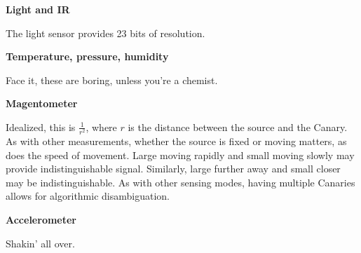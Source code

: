 \documentclass[11pt]{letter} %
\begin{document}
\vspace{30 pt}

\textbf{Light and IR}

The light sensor provides 23 bits of resolution. 

\vspace{30 pt}

\textbf{Temperature, pressure, humidity}

Face it, these are boring, unless you're a chemist.

\vspace{30 pt}

\textbf{Magentometer}

Idealized, this is \(\frac{1}{r^2}\), where \(r\) is the distance between the source and the Canary. As with other measurements, whether the source is fixed or moving matters, as does the speed of movement. Large moving rapidly and small moving slowly may provide indistinguishable signal. Similarly, large further away and small closer may be indistinguishable. As with other sensing modes, having multiple Canaries allows for algorithmic disambiguation. 

\vspace{30 pt}

\textbf{Accelerometer}

Shakin' all over.
\end{document}
